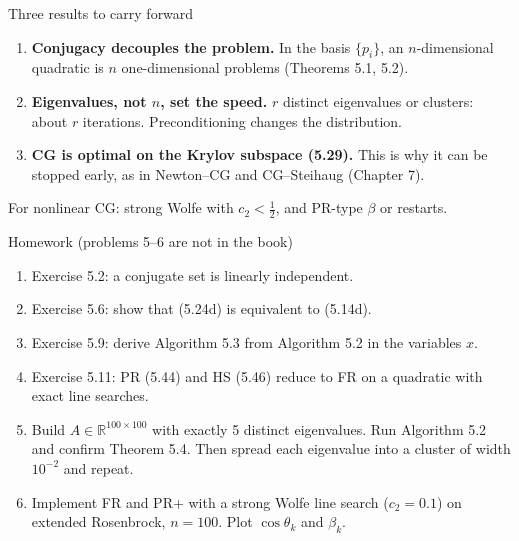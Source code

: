 \documentclass[12pt,aspectratio=169]{beamer}
\newcommand{\R}{\mathbb{R}}
\begin{document}
\begin{frame}{Three results to carry forward}
  \begin{enumerate}
    \item \textbf{Conjugacy decouples the problem.}
      In the basis $\{p_i\}$, an $n$-dimensional quadratic is $n$ one-dimensional problems (Theorems 5.1, 5.2).
    \item \textbf{Eigenvalues, not $n$, set the speed.}
      $r$ distinct eigenvalues or clusters: about $r$ iterations. Preconditioning changes the distribution.
    \item \textbf{CG is optimal on the Krylov subspace (5.29).}
      This is why it can be stopped early, as in Newton--CG and CG--Steihaug (Chapter 7).
  \end{enumerate}
  \vspace{1ex}
  For nonlinear CG: strong Wolfe with $c_2<\tfrac12$, and PR-type $\beta$ or restarts.
\end{frame}

\begin{frame}{Homework {\normalsize (problems 5--6 are not in the book)}}
  \begin{enumerate}
    \item Exercise 5.2: a conjugate set is linearly independent.
    \item Exercise 5.6: show that (5.24d) is equivalent to (5.14d).
    \item Exercise 5.9: derive Algorithm 5.3 from Algorithm 5.2 in the variables $\hat x$.
    \item Exercise 5.11: PR (5.44) and HS (5.46) reduce to FR on a quadratic with exact line searches.
    \item Build $A\in\R^{100\times100}$ with exactly 5 distinct eigenvalues. Run Algorithm 5.2 and confirm Theorem 5.4.
      Then spread each eigenvalue into a cluster of width $10^{-2}$ and repeat.
    \item Implement FR and PR+ with a strong Wolfe line search ($c_2=0.1$) on extended Rosenbrock, $n=100$.
      Plot $\cos\theta_k$ and $\beta_k$.
  \end{enumerate}
\end{frame}
\end{document}

